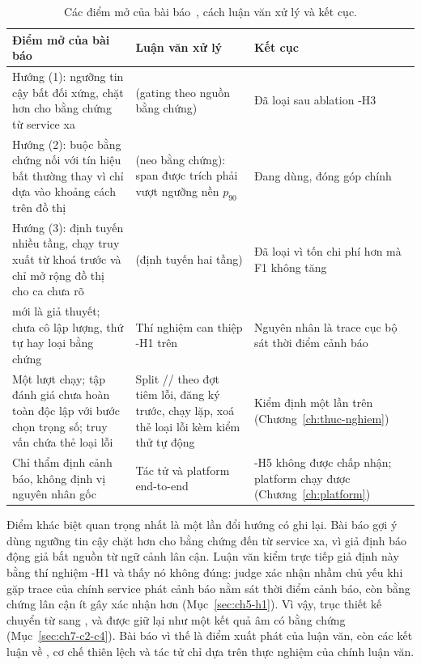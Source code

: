 \begin{table}[H]
  \centering
  \caption[Điểm mở của bài báo và cách luận văn xử lý]{Các điểm mở của bài báo~\cite{icaetm2026}, cách luận văn xử lý và kết cục.}
  \label{tab:ch9-quan-he}
  \tblfont
  \tblsetup
  \setlength{\tabcolsep}{3.5pt}
  \begin{tabularx}{\linewidth}{|>{\raggedright\arraybackslash}p{4.4cm}|Y|>{\raggedright\arraybackslash}p{3.6cm}|}
    \hline
    \textbf{Điểm mở của bài báo} & \textbf{Luận văn xử lý} & \textbf{Kết cục} \\
    \hline
    Hướng (1): ngưỡng tin cậy bất đối xứng, chặt hơn cho bằng chứng từ service xa &  (gating theo nguồn bằng chứng) & Đã loại sau ablation \hyp{H3} \\
    \hline
    Hướng (2): buộc bằng chứng nối với tín hiệu bất thường thay vì chỉ dựa vào khoảng cách trên đồ thị &  (neo bằng chứng): span được trích phải vượt ngưỡng nền $p_{90}$ & Đang dùng, đóng góp chính \\
    \hline
    Hướng (3): định tuyến nhiều tầng, chạy truy xuất từ khoá trước và chỉ mở rộng đồ thị cho ca chưa rõ &  (định tuyến hai tầng) & Đã loại vì tốn chi phí hơn mà F1 không tăng \\
    \hline
     mới là giả thuyết; chưa cô lập lượng, thứ tự hay loại bằng chứng & Thí nghiệm can thiệp \hyp{H1} trên  & Nguyên nhân là trace cục bộ sát thời điểm cảnh báo \\
    \hline
    Một lượt chạy; tập đánh giá chưa hoàn toàn độc lập với bước chọn trọng số; truy vấn  chứa thẻ loại lỗi & Split // theo đợt tiêm lỗi, đăng ký trước, chạy lặp, xoá thẻ loại lỗi kèm kiểm thử tự động & Kiểm định một lần trên  (Chương~\ref{ch:thuc-nghiem}) \\
    \hline
    Chỉ thẩm định cảnh báo, không định vị nguyên nhân gốc & Tác tử  và platform end-to-end & \hyp{H5} không được chấp nhận; platform chạy được (Chương~\ref{ch:platform}) \\
    \hline
  \end{tabularx}
\end{table}

Điểm khác biệt quan trọng nhất là một lần đổi hướng có ghi lại. Bài báo gợi ý dùng ngưỡng tin cậy chặt hơn cho bằng chứng đến từ service xa, vì giả định báo động giả bắt nguồn từ ngữ cảnh lân cận. Luận văn kiểm trực tiếp giả định này bằng thí nghiệm \hyp{H1} và thấy nó không đúng: judge xác nhận nhầm chủ yếu khi gặp trace của chính service phát cảnh báo nằm sát thời điểm cảnh báo, còn bằng chứng lân cận ít gây xác nhận hơn (Mục~\ref{sec:ch5-h1}). Vì vậy, trục thiết kế chuyển từ  sang , và  được giữ lại như một kết quả âm có bằng chứng (Mục~\ref{sec:ch7-c2-c4}). Bài báo vì thế là điểm xuất phát của luận văn, còn các kết luận về \CTAV{}, cơ chế thiên lệch và tác tử  chỉ dựa trên thực nghiệm của chính luận văn.
